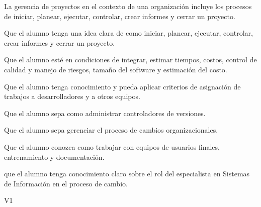 \begin{syllabus}


\begin{justification}
	La gerencia de proyectos en el contexto de una organización incluye los procesos de iniciar, planear, ejecutar, controlar, crear informes y cerrar un proyecto.
	\end{justification}
	
	\begin{goals}
	\item Que el alumno tenga una idea clara de como iniciar, planear, ejecutar, controlar, crear informes y cerrar un proyecto.
	\item Que el alumno esté en condiciones de integrar, estimar tiempos, costos, control de calidad y manejo de riesgos, tamaño del software y estimación del costo.
	\item Que el alumno tenga conocimiento y pueda aplicar criterios de asignación de trabajos a desarrolladores y a otros equipos.
	\item Que el alumno sepa como administrar controladores de versiones. 
	\item Que el alumno sepa gerenciar el proceso de cambios organizacionales.
	\item Que el alumno conozca como trabajar con equipos de usuarios finales, entrenamiento y documentación.
	\item que el alumno tenga conocimiento claro sobre el rol del especialista en Sistemas de Información en el proceso de cambio.
	\end{goals}
	
	\begin{outcomes}{V1}
		\item {}
		\item {}
		\item {}
		\item {}
		\item {}
		\item {}
		\item {}
		\item {}
	\end{outcomes}
	

\end{syllabus}
